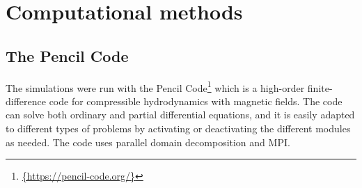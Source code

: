 \documentclass[baaa]{baaa}
\begin{document}
\section{Computational methods}\label{S_model}
\subsection{The Pencil Code}
 
The simulations were run with the {\sc Pencil Code}\footnote{\url{{https://pencil-code.org/}}} \citep{pencil} which is a high-order finite-difference code for compressible hydrodynamics with magnetic fields. The code can solve both ordinary and partial differential equations, and it is easily adapted to different types of problems by activating or deactivating the different modules as needed. The code uses parallel domain decomposition and MPI.
\end{document}
